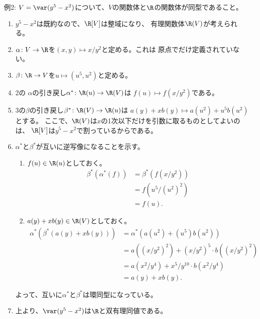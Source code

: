 \begin{framed}
  例2:
  $V=\var(y^5-x^2)$について、$V$の関数体と$\R$の関数体が同型であること。
\end{framed}
\begin{myproof}
  \begin{enumerate}
    \item $y^5-x^2$は既約なので、$\R[V]$は整域になり、
    有理関数体$\R(V)$が考えられる。
    \item
    $\alpha\colon V\to \R$を$(x,y)\mapsto x/y^2$と定める。これは
    原点でだけ定義されていない。
    \item
    $\beta\colon \R \to V$を$u\mapsto (u^5,u^2)$と定める。
    \item
    2の
    $\alpha$の引き戻し$\alpha^*\colon \R(u)\to \R(V)$は
    $f(u) \mapsto f(x/y^2)$である。
    \item
    3の$\beta$の引き戻し$\beta^*\colon \R(V) \to \R(u)$は
    $a(y) + xb(y) \mapsto a(u^2) + u^5 b(u^2)$とする。
    ここで、$\R(V)$は$x$の1次以下だけを引数に取るものとしてよいのは、
    $\R[V]$は$y^5-x^2$で割っているからである。
    \item
    $\alpha^*$と$\beta^*$が互いに逆写像になることを示す。
    \begin{enumerate}
      \item  $f(u) \in \R(u)$としておく。
      \begin{align}
        \beta^*(\alpha^*(f))
        &=
        \beta^*(f(x/y^2))\\
        &=
        f(u^5/(u^2)^2)\\
        &=
        f(u).
      \end{align}
      \item $a(y) + xb(y) \in \R(V)$としておく。
      \begin{align}
        \alpha^*(\beta^*(a(y)+xb(y)))
        &=
        \alpha^*(a(u^2)+(u^5)b(u^2))\\
        &=
        a((x/y^2)^2) + (x/y^2)^5 \cdot b((x/y^2)^2)\\
        &=
        a(x^2/y^4) + x^5/y^{10} \cdot b(x^2/y^4)\\
        &=
        a(y) + x b(y).
      \end{align}
    \end{enumerate}
    よって、互いに$\alpha^*$と$\beta^*$は環同型になっている。
    \item
    上より、$\var(y^5-x^2)$は$\R$と双有理同値である。
  \end{enumerate}
\end{myproof}


